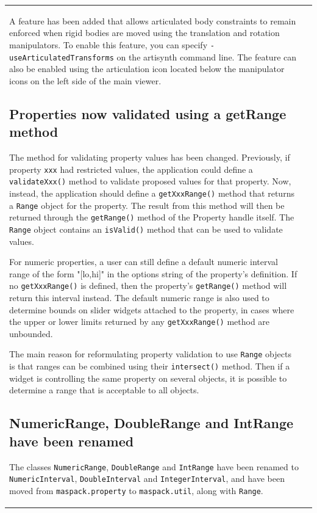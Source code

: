 \documentclass{article}
\begin{document}
\begin{tabular}{ll}
A feature has been added that allows articulated body constraints to
remain enforced when rigid bodies are moved using the translation and
rotation manipulators. To enable this feature, you can specify
{\tt -useArticulatedTransforms} on the artisynth command line.  The
feature can also be enabled using the articulation icon located below
the manipulator icons on the left side of the main viewer.

\subsection*{Properties now validated using a getRange method}

The method for validating property values has been changed.
Previously, if property {\tt xxx} had restricted values, the application
could define a {\tt validateXxx()} method to validate proposed values for
that property. Now, instead, the application should define a
{\tt getXxxRange()} method that returns a {\tt Range} object for the
property. The result from this method will then be returned through
the {\tt getRange()} method of the Property handle itself.  The {\tt Range}
object contains an {\tt isValid()} method that can be used to validate
values.

For numeric properties, a user can still define a default numeric
interval range of the form "[lo,hi]" in the options string of the
property's definition. If no {\tt getXxxRange()} is defined, then the
property's {\tt getRange()} method will return this interval instead.  The
default numeric range is also used to determine bounds on slider
widgets attached to the property, in cases where the upper or lower
limits returned by any {\tt getXxxRange()} method are unbounded.

The main reason for reformulating property validation to use {\tt Range}
objects is that ranges can be combined using their {\tt intersect()}
method. Then if a widget is controlling the same property on several
objects, it is possible to determine a range that is acceptable to all
objects.

\subsection*{NumericRange, DoubleRange and IntRange have been renamed}

The classes {\tt NumericRange}, {\tt DoubleRange} and {\tt IntRange} have been
renamed to {\tt NumericInterval}, {\tt DoubleInterval} and {\tt IntegerInterval},
and have been moved from {\tt maspack.property} to
{\tt maspack.util}, along with {\tt Range}.


\end{tabular}
\end{document}
